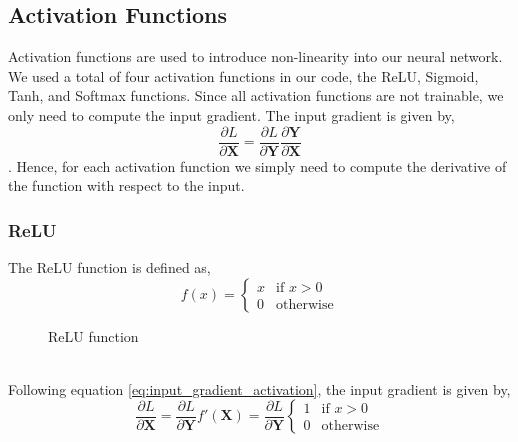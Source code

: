 \documentclass[11pt]{article}
\theoremstyle{definition}
\begin{document}
\subsection{Activation Functions}
Activation functions are used to introduce non-linearity into our neural network. We 
used a total of four activation functions in our code, the ReLU, Sigmoid, Tanh, and 
Softmax functions. Since all activation functions are not trainable, we only need to 
compute the input gradient. The input gradient is given by,
\begin{equation}
    \frac{\partial L}{\partial \mathbf{X}} = \frac{\partial L}{\partial \mathbf{Y}} \frac{\partial \mathbf{Y}}{\partial \mathbf{X}} 
    \label{eq:input_gradient_activation}
\end{equation}
. Hence, for each activation function we simply need to compute the derivative of the 
function with respect to the input.
\subsubsection{ReLU}
The ReLU function is defined as,
\begin{equation}
    f(x) = 
    \begin{cases}
        x & \text{if } x > 0 \\
        0 & \text{otherwise}
    \end{cases}
\end{equation}
\begin{figure}[h]
    \centering
        \caption{ReLU function}
    \label{fig:relu}
\end{figure}\\
Following equation \ref{eq:input_gradient_activation}, the input gradient is given by,
\begin{equation}
    \frac{\partial L}{\partial \mathbf{X}} = 
    \frac{\partial L}{\partial \mathbf{Y}} f'(\mathbf{X}) = 
    \frac{\partial L}{\partial \mathbf{Y}}
    \begin{cases}
        1 & \text{if } x > 0 \\
        0 & \text{otherwise}
    \end{cases}
\end{equation}
\end{document}
